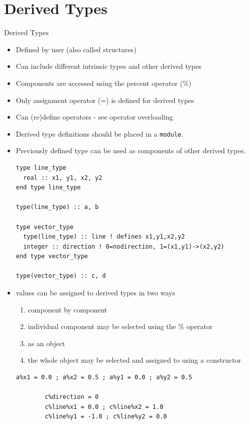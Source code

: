 \documentclass[c,mathserif,compress,xcolor=svgnames]{beamer}
\newcommand{\lstfortran}[1]{\lstinline[language={[90]Fortran},basicstyle=\footnotesize\ttfamily]|#1|}
\begin{document}
\section{Derived Types}
\begin{frame}{Derived Types}
  \begin{itemize}
    \item Defined by user (also called structures)
    \item Can include different intrinsic types and other derived types
    \item Components are accessed using the percent operator (\%)
    \item Only assignment operator (=) is defined for derived types
    \item Can (re)define operators - see operator overloading
    \item Derived type definitions should be placed in a \lstfortran{module}.
    \item Previously defined type can be used as components of other derived types.
      \begin{lstlisting}[language={[90]Fortran},basicstyle=\fontsize{5}{6}\selectfont\ttfamily]
type line_type
  real :: x1, y1, x2, y2
end type line_type

type(line_type) :: a, b

type vector_type
  type(line_type) :: line ! defines x1,y1,x2,y2
  integer :: direction ! 0=nodirection, 1=(x1,y1)->(x2,y2)
end type vector_type

type(vector_type) :: c, d
      \end{lstlisting}
    \framebreak
    \item values can be assigned to derived types in two ways
    \begin{enumerate}
      \item component by component
      \item[] individual component may be selected using the \% operator
      \item as an object
      \item[] the whole object may be selected and assigned to using a constructor
    \end{enumerate}
      \begin{lstlisting}[language={[90]Fortran},basicstyle=\fontsize{5}{6}\selectfont\ttfamily]
        a%x1 = 0.0 ; a%x2 = 0.5 ; a%y1 = 0.0 ; a%y2 = 0.5
        
        c%direction = 0 
        c%line%x1 = 0.0 ; c%line%x2 = 1.0 
        c%line%y1 = -1.0 ; c%line%y2 = 0.0


\end{lstlisting}
\end{itemize}
\end{frame}
\end{document}
